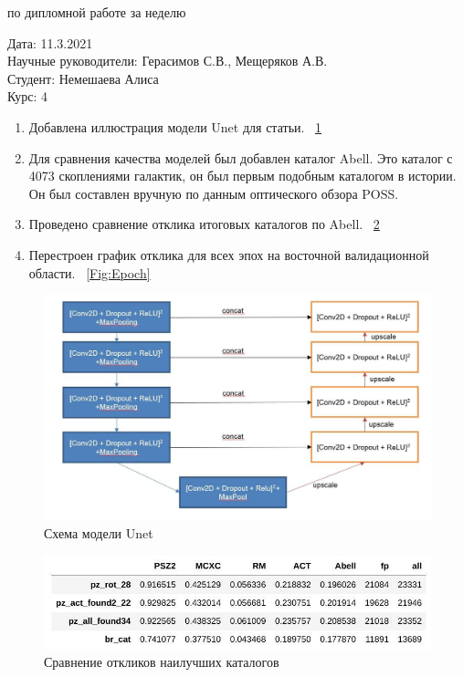 \documentclass{article}
\begin{document}
\begin{center}{ по дипломной работе за неделю\\}\end{center}
Дата: 11.3.2021\\
Научные руководители: Герасимов С.В., Мещеряков А.В.\\
Студент: Немешаева Алиса\\
Курс: 4\\

\renewcommand{\labelitemi}{$\blacksquare$}
\renewcommand\labelitemii{$\square$}
\begin{enumerate}
    \item Добавлена иллюстрация модели Unet для статьи. 
        ~\ref{Fig:Unet}{}\\
    \item Для сравнения качества моделей был добавлен каталог Abell. Это каталог с 4073 скоплениями 
        галактик, он был первым подобным каталогом в истории. Он был составлен вручную по данным 
        оптического обзора POSS.\\
    \item Проведено сравнение отклика итоговых каталогов по Abell.
        ~\ref{Fig:Recall}{}\\
    \item Перестроен график отклика для всех эпох на восточной валидационной области.
        ~\ref{Fig:Epoch}{}\\
\end{enumerate}




\begin{figure}[h]
\includegraphics[width=0.8\linewidth]{unet}
\caption{Схема модели Unet}
\label{Fig:Unet}
\end{figure}
\begin{figure}[h]
\includegraphics[width=0.8\linewidth]{recall}
\caption{Сравнение откликов наилучших каталогов}
\label{Fig:Recall}
\end{figure}
\end{document}
